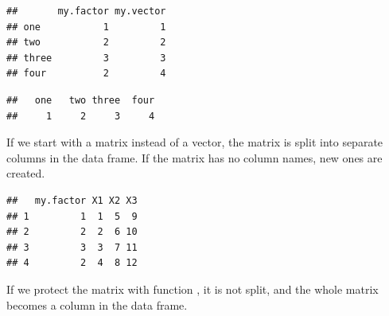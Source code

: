 \documentclass[krantz2]{krantz}\usepackage{knitr}
\begin{document}
\begin{advplayground}
\begin{knitrout}\footnotesize
{}\color{fgcolor}\begin{kframe}
\begin{alltt}
 \hlkwb{<-}  
\end{alltt}
\begin{verbatim}
##       my.factor my.vector
## one           1         1
## two           2         2
## three         3         3
## four          2         4
\end{verbatim}
\begin{alltt}
\hlopt{$}
\end{alltt}
\begin{verbatim}
##   one   two three  four 
##     1     2     3     4
\end{verbatim}
\end{kframe}
\end{knitrout}

If we start with a matrix instead of a vector, the matrix is split into separate columns in the data frame. If the matrix has no column names, new ones are created.

\begin{knitrout}\footnotesize
{}\color{fgcolor}\begin{kframe}
\begin{alltt}
 \hlkwb{<-} \hlstd{(}\hlopt{:}\hlstd{,}  \hlstd{=} \hlstd{)}
 \hlkwb{<-} 
\end{alltt}
\begin{verbatim}
##   my.factor X1 X2 X3
## 1         1  1  5  9
## 2         2  2  6 10
## 3         3  3  7 11
## 4         2  4  8 12
\end{verbatim}
\end{kframe}
\end{knitrout}

If we protect the matrix with function , it is not split, and the whole matrix becomes a column in the data frame.


\end{advplayground}
\end{document}
